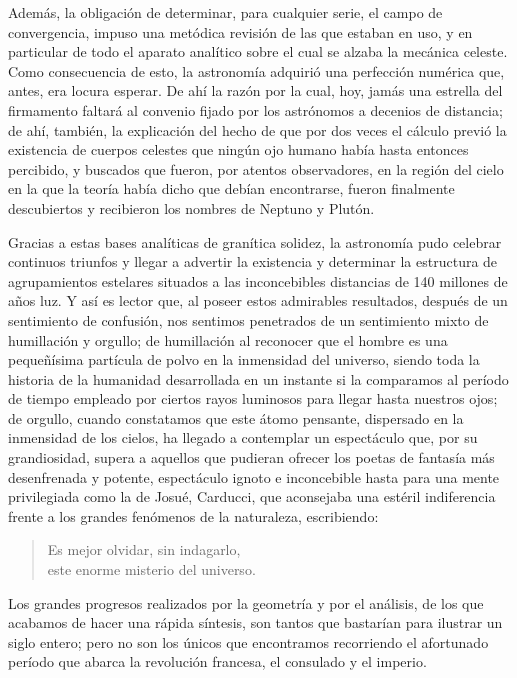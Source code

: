 \documentclass[a4paper, 12pt, draft]{article}
\begin{document}
{{Además, la obligación de determinar, para cualquier serie, el campo de convergencia, impuso una metódica revisión de las que estaban en uso, y en particular de todo el aparato analítico sobre el cual se alzaba la mecánica celeste. Como consecuencia de esto, la astronomía adquirió una perfección numérica que, antes, era locura esperar. De ahí la razón por la cual, hoy, jamás una estrella del firmamento faltará al convenio fijado por los astrónomos a decenios de distancia; de ahí, también,
la explicación del hecho de que por dos veces el cálculo previó la existencia de cuerpos celestes que ningún ojo humano había hasta entonces percibido, y buscados que fueron, por atentos observadores, en la región del cielo en la que la teoría había dicho que debían encontrarse, fueron finalmente descubiertos y recibieron los nombres de Neptuno y
Plutón.

Gracias a estas bases analíticas de granítica solidez, la astronomía pudo celebrar continuos triunfos y llegar a advertir la existencia y determinar la estructura de agrupamientos estelares situados a las inconcebibles distancias de 140 millones de años luz. Y así es lector que, al poseer estos admirables resultados, después de un sentimiento de confusión, nos sentimos penetrados de un sentimiento mixto de humillación y orgullo; de humillación al reconocer que el hombre es una pequeñísima partícula de polvo en la inmensidad del universo, siendo toda la historia de la humanidad desarrollada en un instante si la comparamos al período de tiempo empleado por ciertos rayos luminosos para llegar hasta nuestros ojos; de orgullo, cuando constatamos que este átomo pensante, dispersado en la inmensidad de los cielos, ha llegado a contemplar un espectáculo que, por su grandiosidad, supera a aquellos que pudieran ofrecer los poetas de fantasía más desenfrenada y potente, espectáculo ignoto e inconcebible hasta para una mente privilegiada como la de Josué, Carducci, que aconsejaba una estéril indiferencia
frente a los grandes fenómenos de la naturaleza, escribiendo:


\begin{verse}


Es mejor olvidar, sin indagarlo,\\
 este enorme misterio del universo.

\end{verse}



Los grandes progresos realizados por la geometría y por el análisis, de los que acabamos de hacer una rápida síntesis, son tantos que bastarían para ilustrar un siglo entero; pero no son los únicos que encontramos recorriendo el afortunado período que abarca la revolución francesa, el consulado y el imperio.


}}
\end{document}
